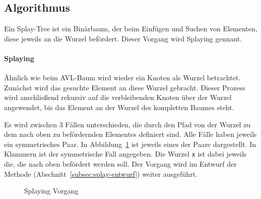 \subsection{Algorithmus}\label{subsec:splay-algorithmus}
Ein Splay-Tree ist ein Binärbaum, der beim Einfügen und Suchen von Elementen, diese jeweils an
die Wurzel befördert.
Dieser Vorgang wird Splaying gennant.

\paragraph{Splaying}
Ähnlich wie beim AVL-Baum wird wieder ein Knoten als Wurzel betrachtet.
Zunächst wird das gesuchte Element an diese Wurzel gebracht.
Dieser Prozess wird anschließend rekursiv auf die verbleibenden Knoten über der Wurzel angewendet,
bis das Element an der Wurzel des kompletten Baumes steht.

Es wird zwischen 3 Fällen unterschieden, die durch den Pfad von der Wurzel zu dem nach oben
zu befördernden Elementes definiert sind.
Alle Fälle haben jeweils ein symmetrisches Paar.
In Abbildung~\ref{fig:splayinCase} ist jeweils eines der Paare dargestellt.
In Klammern ist der symmetrische Fall angegeben.
Die Wurzel \verb|x| ist dabei jeweils die, die nach oben befördert werden soll.
Der Vorgang wird im Entwurf der Methode  (Abschnitt~\ref{subsec:splay-entwurf})
weiter ausgeführt.

\begin{figure}[hbt]
    \centering
    \qquad
    \qquad
    \caption{Splaying Vorgang}\label{fig:splayinCase}
\end{figure}

